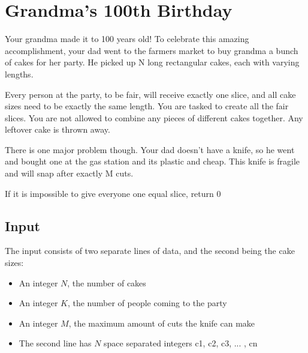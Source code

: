 \documentclass{article}
\let\oldsection\section
\renewcommand\section{\clearpage\oldsection}
\begin{document}


\section{Grandma's 100th Birthday}

Your grandma made it to 100 years old! To celebrate this amazing accomplishment,
your dad went to the farmers market to buy grandma a bunch of cakes for her party.
He picked up N long rectangular cakes, each with varying lengths. \newline \newline

Every person at the party, to be fair, will receive exactly one slice, and all
cake sizes need to be exactly the same length. You are tasked to create all the 
fair slices. You are not allowed to combine any pieces of different cakes 
together. Any leftover cake is thrown away. \newline \newline

There is one major problem though. Your dad doesn't have a knife, so he went and
bought one at the gas station and its plastic and cheap. This knife is fragile 
and will snap after exactly M cuts. \newline \newline

If it is impossible to give everyone one equal slice, return 0 \newline \newline

\subsection{Input}

The input consists of two separate lines of data, and the second being the cake sizes:
\begin{itemize}
    \item An integer $N$, the number of cakes
    \item An integer $K$, the number of people coming to the party
    \item An integer $M$, the maximum amount of cuts the knife can make
    \item The second line has $N$ space separated integers c1, c2, c3, ... , cn 
\end{itemize}
\end{document}
